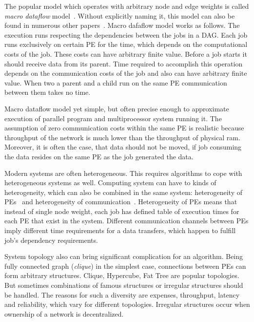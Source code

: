 The popular model which operates with arbitrary node and edge weights
is called \emph{macro dataflow}
model~\cite{yang1992pyrros,wu1990hypertool}.  Without explicitly
naming it, this model can also be found in numerous other
papers~\cite{adam1974, kwok1999static, sakellariou2004low}. Macro dafaflow
model works as follows. The execution runs respecting the dependencies
between the jobs in a DAG. Each job runs exclusively on certain PE for
the time, which depends on the computational  costs of the job. These costs can have arbitrary
finite value. Before a job starts it should receive data from its
parent. Time required to accomplish this operation depends on the
communication costs of the job and also can have arbitrary finite
value. When two a parent and a child run on the same PE communication
between them takes no time.

Macro dataflow model yet simple, but often precise enough to
approximate execution of parallel program and multiprocessor system
running it. The assumption of zero communication costs within the same
PE is realistic because throughput of the network is much lower than
the throughput of physical ram. Moreover, it is often the case, that
data should not be moved, if job consuming the data resides on the
same PE as the job generated the data.

Modern systems are often heterogeneous. This requires algorithms to
cope with heterogeneous systems as well. Computing system can have to
kinds of heterogeneity, which can also be combined in the same system:
heterogeneity of PEs~\cite{grajcar1999genetic, Topcuoglu2002,
  arabnejad2014list} and heterogeneity of
communication~\cite{arabnejad2014list,
  bittencourt2010dag}. Heterogeneity of PEs means that instead of
single node weight, each job has defined table of execution times for
each PE that exist in the system. Different communication channels
between PEs imply different time requirements for a data transfers,
which happen to fulfill job's dependency requirements.

System topology also can bring significant complication for an
algorithm. Being fully connected graph (\emph{clique}) in the simplest
case, connections between PEs can form arbitrary structures. Clique,
Hypercube, Fat Tree are popular topologies. But sometimes combinations
of famous structures or irregular structures should be handled. The
reasons for such a diversity are expenses, throughput, latency and
reliability, which vary for different topologies. Irregular structures
occur when ownership of a network is decentralized.

